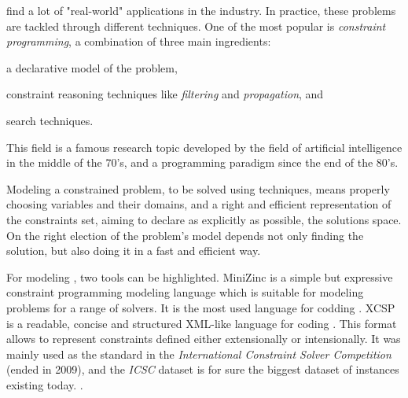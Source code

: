 \csps{} find a lot of "real-world" applications in the industry. In practice, these problems are tackled through different techniques. One of the most popular is \textit{constraint programming}, a combination of three main ingredients: \begin{inparaenum}[i)] \item a declarative model of the problem, \item constraint reasoning techniques like \textit{filtering} and \textit{propagation}, and \item search techniques. \end{inparaenum} This field is a famous research topic developed by the field of artificial intelligence in the middle of the 70's, and a programming paradigm since the end of the 80's.

Modeling a constrained problem, to be solved using \cp{} techniques, means properly choosing variables and their domains, and a right and efficient representation of the constraints set, aiming to declare as explicitly as possible, the solutions space. On the right election of the problem's model depends not only finding the solution, but also doing it in a fast and efficient way.

For modeling \csps{}, two tools can be highlighted. {\sc MiniZinc} is a simple but expressive constraint programming modeling language which is suitable for modeling problems for a range of solvers. It is the most used language for codding \csps{} \cite{Nethercote}. {\sc XCSP} is a readable, concise and structured XML-like language for coding \csps. This format allows to represent constraints defined either extensionally or intensionally. %
It was mainly used as the standard in the {\it International Constraint Solver Competition} (ended in 2009), and the {\it ICSC} dataset is for sure the biggest dataset of \csps{} instances existing today. . 

